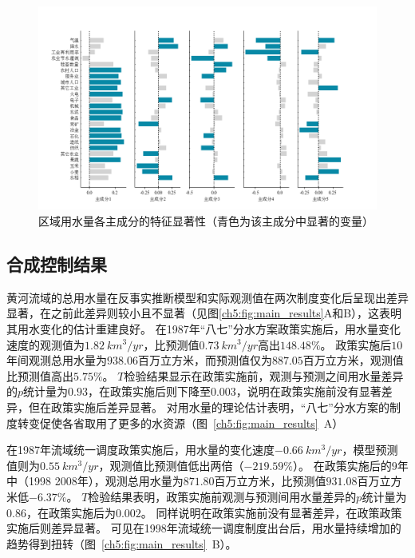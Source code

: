 \begin{figure}[!ht]
    \centering
    \includegraphics[width=\textwidth]{img/ch5/ch5_variables.png}
    \caption[区域用水量各主成分的特征显著性]{区域用水量各主成分的特征显著性（青色为该主成分中显著的变量）}\label{ch5:fig:variables}
\end{figure}

\subsection{合成控制结果}\label{result-2}

黄河流域的总用水量在反事实推断模型和实际观测值在两次制度变化后呈现出差异显著，在之前此差异则较小且不显著（见图\ref{ch5:fig:main_results}A和B），这表明其用水变化的估计重建良好。
在1987年“八七”分水方案政策实施后，用水量变化速度的观测值为$1.82~km^3/yr$，比预测值$0.73~km^3/yr$高出$148.48\%$。
政策实施后$10$年间观测总用水量为$938.06$百万立方米，而预测值仅为$887.05$百万立方米，观测值比预测值高出$5.75\%$。
$T$检验结果显示在政策实施前，观测与预测之间用水量差异的$p$统计量为$0.93$，在政策实施后则下降至$0.003$，说明在政策实施前没有显著差异，但在政策实施后差异显著。
对用水量的理论估计表明，“八七”分水方案的制度转变促使各省取用了更多的水资源（图~\ref{ch5:fig:main_results}~A）

在1987年流域统一调度政策实施后，用水量的变化速度$-0.66~km^3/yr$，模型预测值则为$0.55~km^3/yr$，观测值比预测值低出两倍（$-219.59\%$）。
在政策实施后的$9$年中（1998 \textendash{} 2008年），观测总用水量为$871.80$百万立方米，比预测值$931.08$百万立方米低$-6.37\%$。
$T$检验结果表明，政策实施前观测与预测间用水量差异的$p$统计量为$0.86$，在政策实施后为$0.002$。
同样说明在政策实施前没有显著差异，在政策政策实施后则差异显著。
可见在1998年流域统一调度制度出台后，用水量持续增加的趋势得到扭转（图~\ref{ch5:fig:main_results}~B）。

